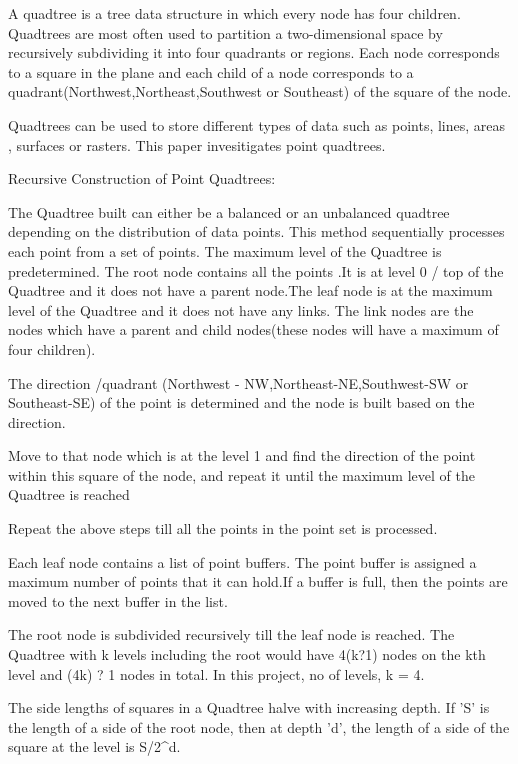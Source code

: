 \documentclass{article}
\begin{document}
A quadtree is a tree data structure in which every node has  four children. Quadtrees are most often used to partition a two-dimensional space by recursively subdividing it into four quadrants or regions. 
Each node corresponds to a square in the plane and each child of a node corresponds to a quadrant(Northwest,Northeast,Southwest or Southeast) of the square of the node.

Quadtrees can be used to store different types of data such as points, lines, areas , surfaces or rasters.
This paper invesitigates point quadtrees.

Recursive Construction of Point Quadtrees:

The Quadtree built can either be a balanced or an unbalanced quadtree depending on the distribution of data points.
This method sequentially processes each point from a set of points.
The maximum level of the Quadtree is predetermined.
The root node contains all the points .It is at level 0 / top of the Quadtree and it does not have a parent node.The leaf node is at the maximum level of the Quadtree and it does not have any links.
The link nodes are the nodes which have a parent and child nodes(these nodes will have a maximum of four children).

The direction /quadrant (Northwest - NW,Northeast-NE,Southwest-SW or Southeast-SE) of the point is determined and the node is built based on the direction.

Move to that node which is at the level 1 and find the direction of the point within this square of the node, and repeat it until the maximum level of the Quadtree is reached

Repeat the above steps till all the points in the point set is processed.

Each leaf node contains a list of point buffers. The point buffer is assigned a maximum number of points that it can hold.If a buffer is full, then the points are moved to the next buffer in the list.

The root node is subdivided recursively till the leaf node is reached. The Quadtree with k levels including the root would have 4(k?1) nodes on the kth level and (4k) ? 1 nodes in total.
In this project, no of levels,  k = 4.

The side lengths of squares in a Quadtree halve with increasing depth. If 'S' is the length of a side of the root node, then at depth 'd', the length of a side of the square at the level is S/2^d.
\end{document}
